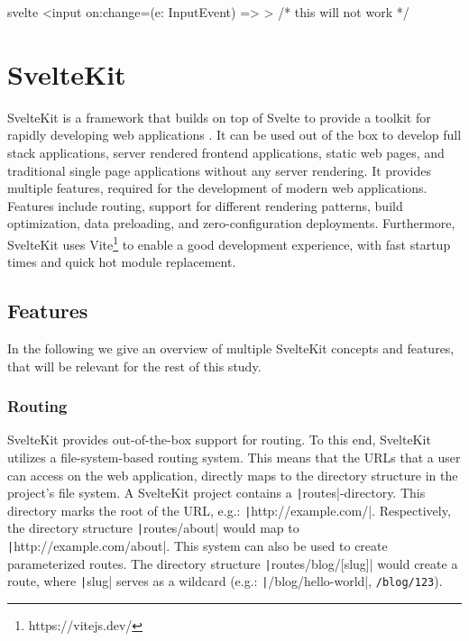 \begin{myminted}{svelte}{}
<input on:change={(e: InputEvent) => {}}> /* this will not work */
\end{myminted}



\section{SvelteKit}
\label{sec:sveltekit}

SvelteKit is a framework that builds on top of Svelte to provide a toolkit for rapidly developing web applications \cite{noauthor_sveltekit_nodate}. It can be used out of the box to develop full stack applications, server rendered frontend applications, static web pages, and traditional single page applications without any server rendering. It provides multiple features, required for the development of modern web applications. Features include routing, support for different rendering patterns, build optimization, data preloading, and zero-configuration deployments. Furthermore, SvelteKit uses Vite\footnote{https://vitejs.dev/} to enable a good development experience, with fast startup times and quick hot module replacement.


\subsection{Features}
In the following we give an overview of multiple SvelteKit concepts and features, that will be relevant for the rest of this study.


\subsubsection{Routing}
\label{sec:sveltekit-routing}

SvelteKit provides out-of-the-box support for routing. To this end, SvelteKit utilizes a file-system-based routing system. This means that the URLs that a user can access on the web application, directly maps to the directory structure in the project's file system. A SvelteKit project contains a \texttt|routes|-directory. This directory marks the root of the URL, e.g.: \texttt|http://example.com/|. Respectively, the directory structure \texttt|routes/about| would map to \texttt|http://example.com/about|. This system can also be used to create parameterized routes. The directory structure \texttt|routes/blog/[slug]| would create a route, where \texttt|slug| serves as a wildcard (e.g.: \texttt|/blog/hello-world|, \texttt{/blog/123}).

